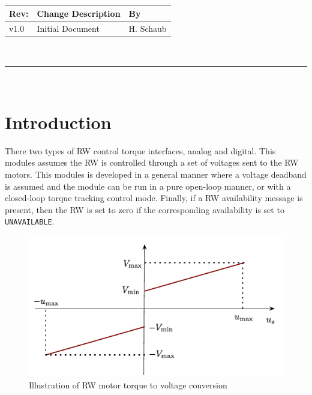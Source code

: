 \documentclass[]{BasiliskReportMemo}
\begin{document}
\makeCover


%
%
\pagestyle{empty}
{\renewcommand{\arraystretch}{1.1}
\noindent
\begin{longtable}{|p{0.5in}|p{4.5in}|p{1.14in}|}
\hline
{\bfseries Rev}: & {\bfseries Change Description} & {\bfseries By} \\
\hline
v1.0 & Initial Document & H. Schaub \\
\hline

\end{longtable}
}

\newpage
\setcounter{page}{1}
\pagestyle{fancy}

\tableofcontents
~\\ \hrule ~\\


\section{Introduction}
There two types of RW control torque interfaces, analog and digital. This modules assumes the RW is controlled through a set of voltages sent to the RW motors.  This modules is developed in a general manner where a voltage deadband is assumed and the module can be run in a pure open-loop manner, or with a closed-loop torque tracking control mode.  Finally, if a RW availability message is present, then the RW is set to zero if the corresponding availability is set to {\tt UNAVAILABLE}. 



\begin{figure}[htb]
	\centerline{
	\includegraphics[]{Figures/us2V}
	}
	\caption{Illustration of RW motor torque to voltage conversion}
	\label{fig:us2V}
\end{figure}
\end{document}
